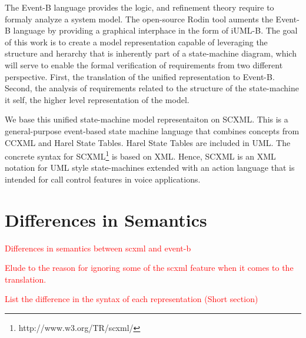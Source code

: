 \documentclass{easychair}
\begin{document}
The Event-B language provides the logic, and refinement
theory require to formaly analyze a system model. The 
open-source Rodin tool auments the Event-B language by 
providing a graphical interphace in the form of
iUML-B. The goal of this work is to create a model 
representation capable of leveraging the structure and 
herarchy that is inherently part of a state-machine 
diagram, which will serve to enable the formal verification
of requirements from two different  perspective. First, 
the translation of the unified representation to Event-B. Second,
the analysis of requirements related to the structure of 
the state-machine it self, the higher level representation 
of the model. 

We base this unified state-machine model representaiton 
on SCXML.  This is a general-purpose event-based state machine 
language that combines concepts from CCXML and Harel 
State Tables. Harel State Tables are included in UML. 
The concrete syntax for SCXML\footnote{http://www.w3.org/TR/scxml/} 
is based on XML. Hence, SCXML is an XML notation for 
UML style state-machines extended with an action 
language that is intended for call control features 
in voice applications.


\section{Differences in Semantics}
\label{sect:diff}

\textcolor{red}{Differences in semantics between scxml and event-b}

\textcolor{red}{Elude to the reason for ignoring some of the scxml feature 
when it comes to the translation.}

\textcolor{red}{List the difference in the syntax of each representation (Short section)}
\end{document}
